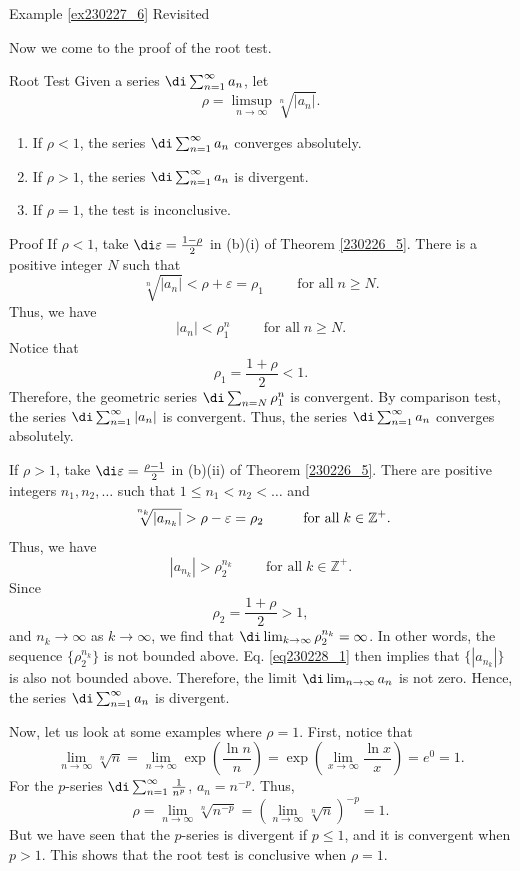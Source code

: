 \begin{example}{\linkt Example \ref{ex230227_6} Revisited}
\begin{example}[label=ex230227_13]{}
Now we come to the proof of the root test.
\begin{theorem}[label=230227_23]{Root Test}
Given a series $\di\sum_{n=1}^{\infty}a_n$, let
\[\rho=\limsup_{n\to\infty}\sqrt[n]{|a_n|}.\]
\begin{enumerate}[1.]
\item
If $\rho<1$, the series $\di\sum_{n=1}^{\infty}a_n$ converges absolutely.
\item If $\rho>1$,  the series $\di\sum_{n=1}^{\infty}a_n$ is divergent.
\item If $\rho=1$, the test is inconclusive.
\end{enumerate}
\end{theorem}\begin{myproof}{Proof}
If $\rho<1$, take $\di\varepsilon=\frac{1-\rho}{2}$ in (b)(i) of Theorem \ref{230226_5}. There is a positive integer $N$ such that 
\[\sqrt[n]{|a_n|}<\rho+\varepsilon=\rho_1\hspace{1cm}\text{for all}\;n\geq N.\]
Thus, we have
\[|a_n|<\rho_1^n\hspace{1cm}\text{for all}\;n\geq N.\]Notice that
\[\rho_1=\frac{1+\rho}{2}<1.\]Therefore, the geometric series $\di\sum_{n=N}\rho_1^n$ is convergent. By comparison test, the series $\di\sum_{n=1}^{\infty}|a_n|$ is convergent. Thus, the series $\di\sum_{n=1}^{\infty}a_n$ converges absolutely.

If $\rho>1$,  take $\di\varepsilon=\frac{ \rho-1}{2}$ in (b)(ii) of Theorem \ref{230226_5}. There are positive  integers $n_1, n_2, \ldots$ such that $1\leq n_1<n_2<\ldots$ and
\[\sqrt[\leftroot{-3}\uproot{ 5} n_k]{|a_{n_k}|}>\rho-\varepsilon=\rho_2\hspace{1cm}\text{for all}\; k\in\mathbb{Z}^+.\]\bp
Thus, we have
\begin{equation}\label{eq230228_1}|a_{n_k}|>\rho_2^{n_k}\hspace{1cm}\text{for all}\;k\in\mathbb{Z}^+.\end{equation}
Since
\[\rho_2=\frac{1+\rho}{2}>1,\]and $n_k\to\infty$ as $k\to\infty$, we find that 
$\di\lim_{k\to\infty}\rho_2^{n_k}=\infty$. In other words, the sequence $\{\rho_2^{n_k}\}$ is not bounded above. Eq. \eqref{eq230228_1} then implies that $\{|a_{n_k}|\}$ is also not bounded above. Therefore, the limit $\di\lim_{n\to\infty}a_n$ is not zero. Hence, the series $\di\sum_{n=1}^{\infty}a_n$ is divergent.

Now, let us look at some examples where $\rho=1$. First, notice that
\begin{equation}\label{eq230305_7}\lim_{n\to\infty}\sqrt[n]{n}=\lim_{n\to\infty}\exp\left(\frac{\ln n}{n}\right)=\exp\left(\lim_{x\to\infty}\frac{\ln x}{x}\right)=e^0=1.\end{equation}
For the $p$-series $\di\sum_{n=1}^{\infty}\frac{1}{n^p}$, $a_n=n^{-p}$. Thus,
\[\rho=\lim_{n\to\infty}\sqrt[n]{n^{-p}}=\left(\lim_{n\to\infty}\sqrt[n]{n}\right)^{-p}=1.\]
But we have seen that the $p$-series is divergent if $p\leq 1$, and it is convergent when $p>1$. This shows that the root test is conclusive when $\rho=1$.
\end{myproof} 


\end{example}
\end{example}
